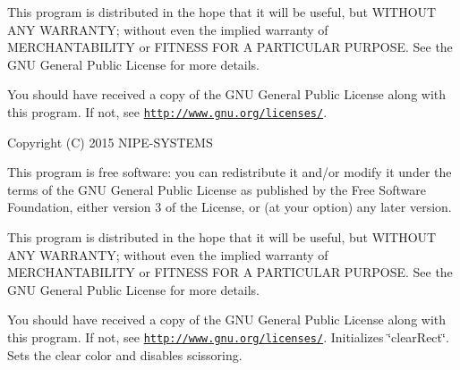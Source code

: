This program is distributed in the hope that it will be useful, but W\+I\+T\+H\+O\+U\+T A\+N\+Y W\+A\+R\+R\+A\+N\+T\+Y; without even the implied warranty of M\+E\+R\+C\+H\+A\+N\+T\+A\+B\+I\+L\+I\+T\+Y or F\+I\+T\+N\+E\+S\+S F\+O\+R A P\+A\+R\+T\+I\+C\+U\+L\+A\+R P\+U\+R\+P\+O\+S\+E. See the G\+N\+U General Public License for more details.

You should have received a copy of the G\+N\+U General Public License along with this program. If not, see \href{http://www.gnu.org/licenses/}{\tt http\+://www.\+gnu.\+org/licenses/}.

Copyright (C) 2015 N\+I\+P\+E-\/\+S\+Y\+S\+T\+E\+M\+S

This program is free software\+: you can redistribute it and/or modify it under the terms of the G\+N\+U General Public License as published by the Free Software Foundation, either version 3 of the License, or (at your option) any later version.

This program is distributed in the hope that it will be useful, but W\+I\+T\+H\+O\+U\+T A\+N\+Y W\+A\+R\+R\+A\+N\+T\+Y; without even the implied warranty of M\+E\+R\+C\+H\+A\+N\+T\+A\+B\+I\+L\+I\+T\+Y or F\+I\+T\+N\+E\+S\+S F\+O\+R A P\+A\+R\+T\+I\+C\+U\+L\+A\+R P\+U\+R\+P\+O\+S\+E. See the G\+N\+U General Public License for more details.

You should have received a copy of the G\+N\+U General Public License along with this program. If not, see \href{http://www.gnu.org/licenses/}{\tt http\+://www.\+gnu.\+org/licenses/}. Initializes \char`\"{}clear\+Rect\char`\"{}. Sets the clear color and disables scissoring. 